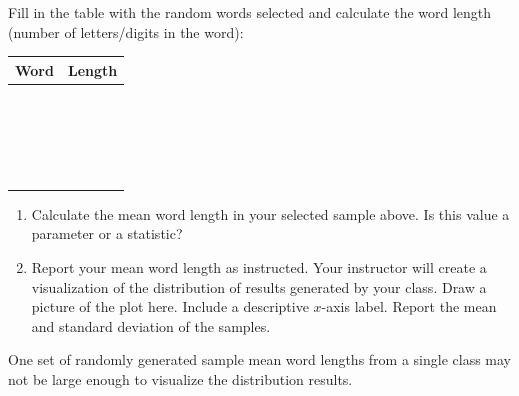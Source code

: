 \documentclass[
]{report}
\begin{document}
\newpage

Fill in the table with the random words selected and calculate the word length (number of letters/digits in the word):

\begin{center}
\begin{tabular}{|p{2.5in}|p{1in}|} \hline
Word  & Length  \\ \hline
 & \\ 
 & \\ \hline
 & \\ 
 & \\ \hline
 & \\ 
 & \\ \hline
 & \\ 
 & \\ \hline
 & \\ 
 & \\ \hline
 & \\ 
 & \\ \hline
 & \\
 & \\ \hline
 & \\ 
 & \\ \hline
 & \\ 
 & \\ \hline
 & \\ 
 & \\ \hline
\end{tabular}
\end{center}

\begin{enumerate}
\def\labelenumi{\arabic{enumi}.}
\setcounter{enumi}{5}
\item
  Calculate the mean word length in your selected sample above. Is this value a parameter or a statistic?
  \vspace{0.3in}
\item
  Report your mean word length as instructed. Your instructor will create a visualization of the distribution of results generated by your class. Draw a picture of the plot here. Include a descriptive \(x\)-axis label. Report the mean and standard deviation of the samples.
\end{enumerate}

\vspace{2.5in}

One set of randomly generated sample mean word lengths from a single class may not be large enough to visualize the distribution results.

\newpage
\end{document}
